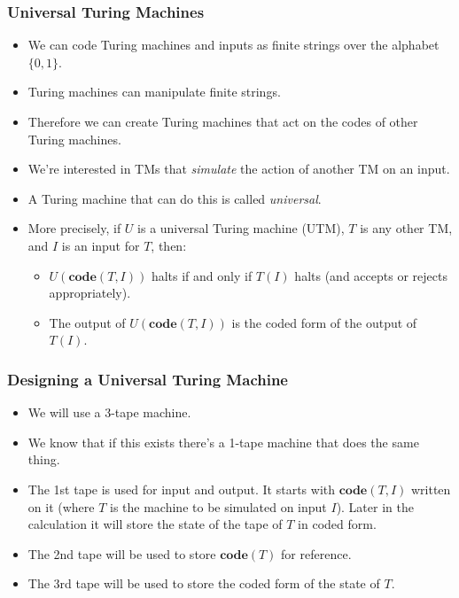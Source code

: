 \documentclass[handout]{beamer}
\newcommand{\co}{\mathbf{code}}
\begin{document}
\begin{frame}
\frametitle{Universal Turing Machines}
\begin{itemize}
\item We can code Turing machines and inputs as finite strings over the alphabet $\{0,1\}$.
\vspace{0.1cm}
\item Turing machines can manipulate finite strings. 
\vspace{0.1cm}
\item Therefore we can create Turing machines that act on the codes of other Turing machines.
\vspace{0.1cm}
\item We're interested in TMs that \emph{simulate} the action of another TM on an input. 
\vspace{0.1cm}
\item A Turing machine that can do this is called \emph{universal}. 
\vspace{0.1cm}
\item More precisely, if $U$ is a universal Turing machine (UTM), $T$ is any other TM, and $I$ is an input for $T$, then:
\begin{itemize} 
\item $U(\co(T,I))$ halts if and only if $T(I)$ halts (and accepts or rejects appropriately). 
\item The output of $U(\co(T,I))$ is the coded form of the output of $T(I)$.
\end{itemize}
\end{itemize}
\end{frame}

\begin{frame}
\frametitle{Designing a Universal Turing Machine}
\begin{itemize}
\item We will use a 3-tape machine.
\vspace{0.3cm}
\item We know that if this exists there's a 1-tape machine that does the same thing.
\vspace{0.3cm}
\item The 1st tape is used for input and output. It starts with $\co(T,I)$ written on it (where $T$ is the machine to be simulated on input $I$). Later in the calculation it will store the state of the tape of $T$ in coded form.
\vspace{0.3cm}
\item The 2nd tape will be used to store $\co(T)$ for reference.
\vspace{0.3cm}
\item The 3rd tape will be used to store the coded form of the state of $T$.
\end{itemize} 
\end{frame}
\end{document}
